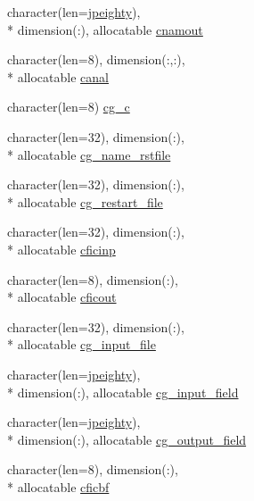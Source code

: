 \begin{DoxyCompactItemize}
\item 
character(len=\hyperlink{classmod__oasis__namcouple_a4fb10ad6e864dcbe34c4a8b02204a523}{jpeighty}), \\*
dimension(\+:), allocatable \hyperlink{classmod__oasis__namcouple_a71ba84b9a7a813ca2551bcde99a0b5b5}{cnamout}
\item 
character(len=8), dimension(\+:,\+:), \\*
allocatable \hyperlink{classmod__oasis__namcouple_a5eaa67fd4db1a3cde074adedd984ffbe}{canal}
\item 
character(len=8) \hyperlink{classmod__oasis__namcouple_a8a7387f27c409ea27aa53b616805f0fa}{cg\+\_\+c}
\item 
character(len=32), dimension(\+:), \\*
allocatable \hyperlink{classmod__oasis__namcouple_ac79429a9522aabddbe4ed68fd9571bec}{cg\+\_\+name\+\_\+rstfile}
\item 
character(len=32), dimension(\+:), \\*
allocatable \hyperlink{classmod__oasis__namcouple_a6eec7fe795bfb9c2058c7953c072d442}{cg\+\_\+restart\+\_\+file}
\item 
character(len=32), dimension(\+:), \\*
allocatable \hyperlink{classmod__oasis__namcouple_af17e746f51dcf0110428ebe55f6d7285}{cficinp}
\item 
character(len=8), dimension(\+:), \\*
allocatable \hyperlink{classmod__oasis__namcouple_a62f96a372f013fc37713f8ba1728e3de}{cficout}
\item 
character(len=32), dimension(\+:), \\*
allocatable \hyperlink{classmod__oasis__namcouple_a24f56cf88d79190f229d3fd1d62d17de}{cg\+\_\+input\+\_\+file}
\item 
character(len=\hyperlink{classmod__oasis__namcouple_a4fb10ad6e864dcbe34c4a8b02204a523}{jpeighty}), \\*
dimension(\+:), allocatable \hyperlink{classmod__oasis__namcouple_aad4d4857b4c424e1b0f0bcc0a01aa6e3}{cg\+\_\+input\+\_\+field}
\item 
character(len=\hyperlink{classmod__oasis__namcouple_a4fb10ad6e864dcbe34c4a8b02204a523}{jpeighty}), \\*
dimension(\+:), allocatable \hyperlink{classmod__oasis__namcouple_a1b680bf476776f3db085dc1f0009736c}{cg\+\_\+output\+\_\+field}
\item 
character(len=8), dimension(\+:), \\*
allocatable \hyperlink{classmod__oasis__namcouple_a9e90e47fd11ff4dd95c61dcf3ec872ff}{cficbf}

\end{DoxyCompactItemize}
